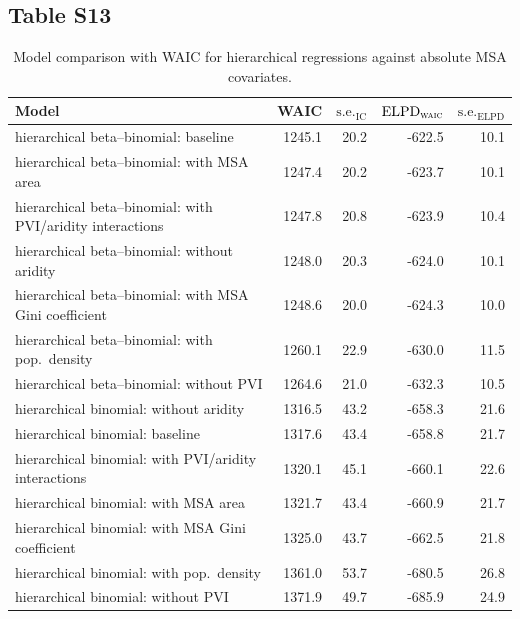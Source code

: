 \documentclass[draft]{agujournal}\usepackage{knitr}
\begin{document}
\subsection*{Table S13}
\begin{table}[H]
\centering
\begingroup\small
\begin{tabular}{p{3in}rrrr}
  \hline
Model & WAIC & $\text{s.e.}_{\text{IC}}$ & $\text{ELPD}_{\text{\scshape{waic}}}$ & $\text{s.e.}_{\text{ELPD}}$ \\ 
  \hline
hierarchical beta--binomial: baseline & 1245.1 & 20.2 & -622.5 & 10.1 \\ 
  hierarchical beta--binomial: with MSA area & 1247.4 & 20.2 & -623.7 & 10.1 \\ 
  hierarchical beta--binomial: with PVI/aridity interactions & 1247.8 & 20.8 & -623.9 & 10.4 \\ 
  hierarchical beta--binomial: without aridity & 1248.0 & 20.3 & -624.0 & 10.1 \\ 
  hierarchical beta--binomial: with MSA Gini coefficient & 1248.6 & 20.0 & -624.3 & 10.0 \\ 
  hierarchical beta--binomial: with pop.\ density & 1260.1 & 22.9 & -630.0 & 11.5 \\ 
  hierarchical beta--binomial: without PVI & 1264.6 & 21.0 & -632.3 & 10.5 \\ 
  hierarchical binomial: without aridity & 1316.5 & 43.2 & -658.3 & 21.6 \\ 
  hierarchical binomial: baseline & 1317.6 & 43.4 & -658.8 & 21.7 \\ 
  hierarchical binomial: with PVI/aridity interactions & 1320.1 & 45.1 & -660.1 & 22.6 \\ 
  hierarchical binomial: with MSA area & 1321.7 & 43.4 & -660.9 & 21.7 \\ 
  hierarchical binomial: with MSA Gini coefficient & 1325.0 & 43.7 & -662.5 & 21.8 \\ 
  hierarchical binomial: with pop.\ density & 1361.0 & 53.7 & -680.5 & 26.8 \\ 
  hierarchical binomial: without PVI & 1371.9 & 49.7 & -685.9 & 24.9 \\ 
   \hline
\end{tabular}
\endgroup
\caption[Model comparison: WAIC (alternate-covariates using alternative scaling) for hierarchical regressions.]{Model comparison with WAIC for hierarchical regressions against absolute MSA covariates.} 
\label{tab:waic.vars}
\end{table}
\end{document}
